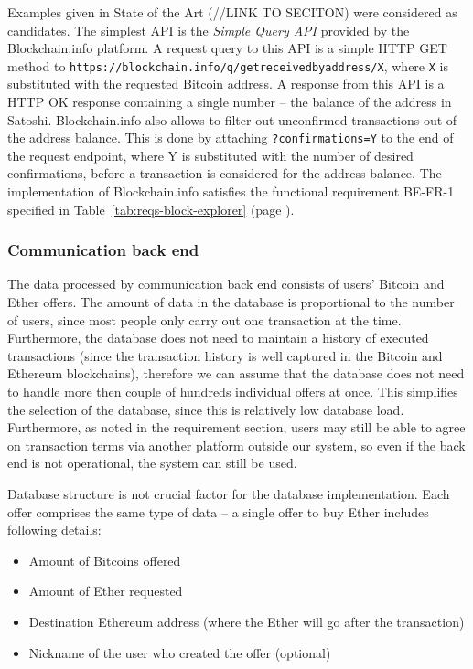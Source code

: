\begin{sloppypar}
Examples given in State of the Art (//LINK TO SECITON) were considered as candidates. The simplest API is the \textit{Simple Query API} provided by the Blockchain.info platform. A request query to this API is a simple HTTP GET method to \texttt{https://blockchain.info/q/getreceivedbyaddress/X}, where \texttt{X} is substituted with the requested Bitcoin address. A response from this API is a HTTP OK response containing a single number -- the balance of the address in Satoshi. Blockchain.info also allows to filter out unconfirmed transactions out of the address balance. This is done by attaching \texttt{?confirmations=Y} to the end of the request endpoint, where Y is substituted with the number of desired confirmations, before a transaction is considered for the address balance. The implementation of Blockchain.info satisfies the functional requirement BE-FR-1 specified in Table~\ref{tab:reqs-block-explorer} (page \pageref{tab:reqs-block-explorer}).
\end{sloppypar}
% 
% 
% 
\subsubsection{Communication back end}
The data processed by communication back end consists of users' Bitcoin and Ether offers. The amount of data in the database is proportional to the number of users, since most people only carry out one transaction at the time. Furthermore, the database does not need to maintain a history of executed transactions (since the transaction history is well captured in the Bitcoin and Ethereum blockchains), therefore we can assume that the database does not need to handle more then couple of hundreds individual offers at once. This simplifies the selection of the database, since this is relatively low database load. Furthermore, as noted in the requirement section, users may still be able to agree on transaction terms via another platform outside our system, so even if the back end is not operational, the system can still be used. 

Database structure is not crucial factor for the database implementation. Each offer comprises the same type of data -- a single offer to buy Ether includes following details:
\begin{itemize}[noitemsep]
    \item Amount of Bitcoins offered
    \item Amount of Ether requested
    \item Destination Ethereum address (where the Ether will go after the transaction)
    \item Nickname of the user who created the offer (optional)
\end{itemize}

